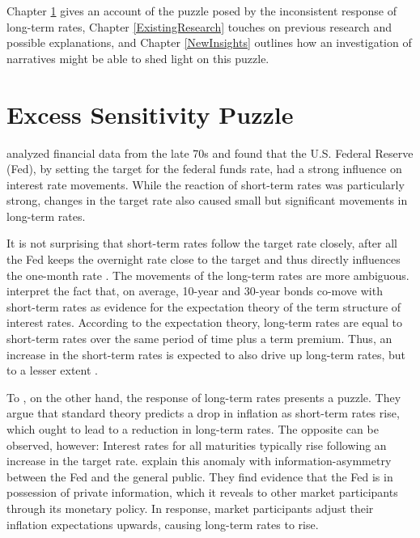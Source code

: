 \documentclass[11pt,a4paper,english,oneside]{book}
\numberwithin{equation}{chapter}
\begin{document}
Chapter \ref{SensitivityPuzzle} gives an account of the puzzle posed by the inconsistent response of long-term rates, Chapter \ref{ExistingResearch} touches on previous research and possible explanations, and Chapter  \ref{NewInsights} outlines how an investigation of narratives might be able to shed light on this puzzle.


\section{Excess Sensitivity Puzzle} \label{SensitivityPuzzle}

\cite{Cook.1989} analyzed financial data from the late 70s and found that the U.S. Federal Reserve (Fed), by setting the target for the federal funds rate, had a strong influence on interest rate movements. While the reaction of short-term rates was particularly strong, changes in the target rate also caused small but significant movements in long-term rates. 
 
It is not surprising that short-term rates follow the target rate closely, after all the Fed keeps the overnight rate close to the target and thus directly influences the one-month rate \citep[p. 1]{Ellingsen.2003}. The movements of the long-term rates are more ambiguous. \citet[pp. 343--346]{Cook.1989} interpret the fact that, on average, 10-year and 30-year bonds co-move with short-term rates as evidence for the expectation theory of the term structure of interest rates. According to the expectation theory, long-term rates are equal to short-term rates over the same period of time plus a term premium. Thus, an increase in the short-term rates is expected to also drive up long-term rates, but to a lesser extent \citep[p. 1594]{Ellingsen.2001}.

To \cite{Romer.2000}, on the other hand, the response of long-term rates presents a puzzle. They argue that standard theory predicts a drop in inflation as short-term rates rise, which ought to lead to a reduction in long-term rates. The opposite can be observed, however: Interest rates for all maturities typically rise following an increase in the target rate. \cite{Romer.2000} explain this anomaly with information-asymmetry between the Fed and the general public. They find evidence that the Fed is in possession of private information, which it reveals to other market participants through its monetary policy. In response, market participants adjust their inflation expectations upwards, causing long-term rates to rise.
\end{document}
